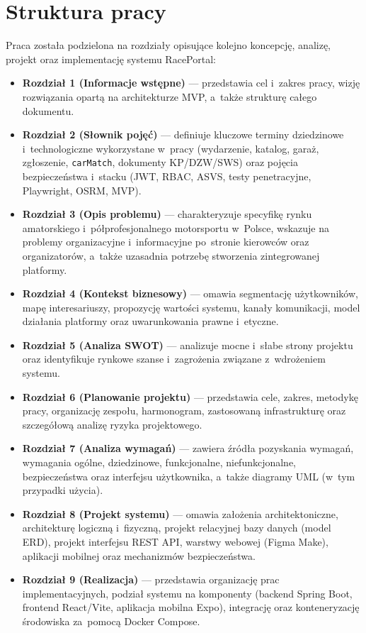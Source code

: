 \documentclass{sprz}
\begin{document}
\section{Struktura pracy}
Praca została podzielona na rozdziały opisujące kolejno koncepcję, analizę, projekt oraz implementację systemu RacePortal:
\begin{itemize}
  \item \textbf{Rozdział 1 (Informacje wstępne)} --- przedstawia cel i~zakres pracy, wizję rozwiązania opartą na architekturze MVP, a~także strukturę całego dokumentu.
  \item \textbf{Rozdział 2 (Słownik pojęć)} --- definiuje kluczowe terminy dziedzinowe i~technologiczne wykorzystane w~pracy (wydarzenie, katalog, garaż, zgłoszenie, \texttt{carMatch}, dokumenty KP/DZW/SWS) oraz pojęcia bezpieczeństwa i~stacku (JWT, RBAC, ASVS, testy penetracyjne, Playwright, OSRM, MVP).
  \item \textbf{Rozdział 3 (Opis problemu)} --- charakteryzuje specyfikę rynku amatorskiego i~półprofesjonalnego motorsportu w~Polsce, wskazuje na problemy organizacyjne i~informacyjne po~stronie kierowców oraz organizatorów, a~także uzasadnia potrzebę stworzenia zintegrowanej platformy.
  \item \textbf{Rozdział 4 (Kontekst biznesowy)} --- omawia segmentację użytkowników, mapę interesariuszy, propozycję wartości systemu, kanały komunikacji, model działania platformy oraz uwarunkowania prawne i~etyczne.
  \item \textbf{Rozdział 5 (Analiza SWOT)} --- analizuje mocne i~słabe strony projektu oraz identyfikuje rynkowe szanse i~zagrożenia związane z~wdrożeniem systemu.
  \item \textbf{Rozdział 6 (Planowanie projektu)} --- przedstawia cele, zakres, metodykę pracy, organizację zespołu, harmonogram, zastosowaną infrastrukturę oraz szczegółową analizę ryzyka projektowego.
  \item \textbf{Rozdział 7 (Analiza wymagań)} --- zawiera źródła pozyskania wymagań, wymagania ogólne, dziedzinowe, funkcjonalne, niefunkcjonalne, bezpieczeństwa oraz interfejsu użytkownika, a~także diagramy UML (w~tym przypadki użycia).
  \item \textbf{Rozdział 8 (Projekt systemu)} --- omawia założenia architektoniczne, architekturę logiczną i~fizyczną, projekt relacyjnej bazy danych (model ERD), projekt interfejsu REST API, warstwy webowej (Figma Make), aplikacji mobilnej oraz mechanizmów bezpieczeństwa.
  \item \textbf{Rozdział 9 (Realizacja)} --- przedstawia organizację prac implementacyjnych, podział systemu na komponenty (backend Spring Boot, frontend React/Vite, aplikacja mobilna Expo), integrację oraz konteneryzację środowiska za~pomocą Docker Compose.

\end{itemize}
\end{document}
